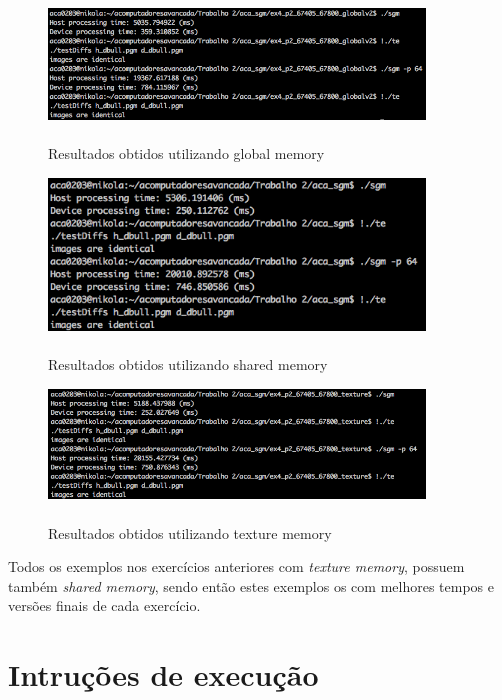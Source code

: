 \documentclass[pdftex,12pt,a4paper]{report}
\begin{document}
\begin{figure}[!htb]
\center
 \includegraphics[width=100mm,scale=1]{CreateDisparityGlobal.png}
 \caption{\\ Resultados obtidos utilizando global memory}
 \label{fig:CreateDisparityGlobal}
\end{figure}

\begin{figure}[!htb]
\center
 \includegraphics[width=100mm,scale=1]{CreateDisparityShared.png}
 \caption{\\ Resultados obtidos utilizando shared memory}
 \label{fig:CreateDisparityShared}
\end{figure}
\newpage
\begin{figure}[!htb]
\center
 \includegraphics[width=100mm,scale=1]{CreateDisparityTexture.png}
 \caption{\\ Resultados obtidos utilizando texture memory}
 \label{fig:CreateDisparityTexture}
\end{figure}

Todos os exemplos nos exercícios anteriores com \textit{texture memory}, possuem também \textit{shared memory}, sendo então estes exemplos os com melhores tempos e versões finais de cada exercício.

\newpage
\section{Intruções de execução}
\end{document}
